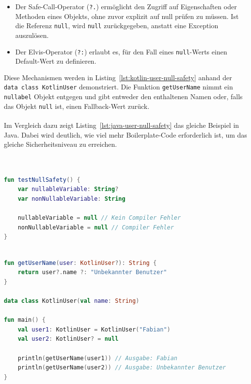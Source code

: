 \documentclass[11pt]{article}
\begin{document}
    \begin{itemize}

        \item
            Der Safe-Call-Operator (\texttt{?.}) ermöglicht den Zugriff auf Eigenschaften oder Methoden eines Objekts, ohne zuvor explizit auf null prüfen zu müssen.
            Ist die Referenz \texttt{null}, wird \texttt{null} zurückgegeben, anstatt eine Exception auszulösen.
        \item
            Der Elvis-Operator (\texttt{?:}) erlaubt es, für den Fall eines \texttt{null}-Werts einen Default-Wert zu definieren.
    \end{itemize}

    Diese Mechanismen werden in Listing~\ref{lst:kotlin-user-null-safety} anhand der \texttt{data class KotlinUser} demonstriert.
    Die Funktion \texttt{getUserName} nimmt ein \texttt{nullabel} Objekt entgegen und gibt entweder den enthaltenen Namen oder, falls das Objekt \texttt{null} ist, einen Fallback-Wert zurück.\\
    \\
    Im Vergleich dazu zeigt Listing~\ref{lst:java-user-null-safety} das gleiche Beispiel in Java.
    Dabei wird deutlich, wie viel mehr Boilerplate-Code erforderlich ist, um das gleiche Sicherheitsniveau zu erreichen.\\
    \\

    \begin{lstlisting}[language=Kotlin, caption={KotlinNullSafety.kt}, label={lst:kotlin-null-safety}]

fun testNullSafety() {
    var nullableVariable: String?
    var nonNullableVariable: String

    nullableVariable = null // Kein Compiler Fehler
    nonNullableVariable = null // Compiler Fehler
}
    \end{lstlisting}

    \begin{lstlisting}[language=Kotlin, caption={KotlinUser.kt}, label={lst:kotlin-user-null-safety}]

fun getUserName(user: KotlinUser?): String {
    return user?.name ?: "Unbekannter Benutzer"
}

data class KotlinUser(val name: String)

fun main() {
    val user1: KotlinUser = KotlinUser("Fabian")
    val user2: KotlinUser? = null

    println(getUserName(user1)) // Ausgabe: Fabian
    println(getUserName(user2)) // Ausgabe: Unbekannter Benutzer
}
    \end{lstlisting}
\end{document}
